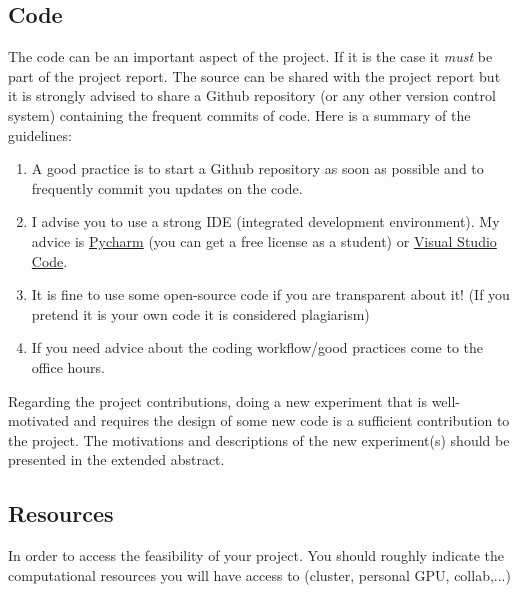 \documentclass{article}
\begin{document}
\subsection{Code}

The code can be an important aspect of the project. If it is the case it \emph{must} be part of the project report. The source can be shared with the project report but it is strongly advised to share a Github repository (or any other version control system) containing the frequent commits of code. Here is a summary of the guidelines:
\begin{enumerate}
    \item A good practice is to start a Github repository as soon as possible and to frequently commit you updates on the code.
    \item I advise you to use a strong IDE (integrated development environment). My advice is \href{https://www.jetbrains.com/community/education/#students}{Pycharm} (you can get a free license as a student) or \href{https://code.visualstudio.com/}{Visual Studio Code}.
    \item It is fine to use some open-source code if you are transparent about it! (If you pretend it is your own code it is considered plagiarism) 
    \item 
	If you need advice about the coding workflow/good practices come to the office hours.
\end{enumerate}

Regarding the project contributions, doing a new experiment that is well-motivated and requires the design of some new code is a sufficient contribution to the project. The motivations and descriptions of the new experiment(s) should be presented in the extended abstract.

\subsection{Resources}

In order to access the feasibility of your project. You should roughly indicate the computational resources you will have access to (cluster, personal GPU, collab,...)

\end{document}
